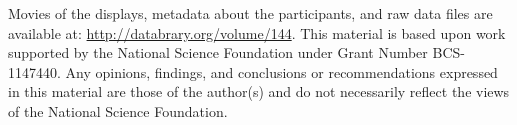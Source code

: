 \documentclass[landscape,final,paperwidth=72in,paperheight=40.5in,fontscale=0.285]{baposter}
\begin{document}
\begin{poster}
{}
    {
       Movies of the displays, metadata about the participants, and raw data files are available at: \url{http://databrary.org/volume/144}.
     }  
    {
      This material is based upon work supported by the National Science Foundation under Grant Number BCS-1147440. Any opinions, findings, and conclusions or recommendations expressed in this material are those of the author(s) and do not necessarily reflect the views of the National Science Foundation.  
    }    
  {
          \tiny
          \renewcommand{\refname}{\vspace{-0.5em}} %
%          
%          
          
          
          

}

\end{poster}
\end{document}
